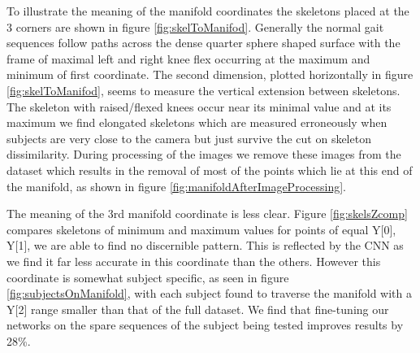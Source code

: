 \documentclass[11pt]{article} %
\begin{document}
To illustrate the meaning of the manifold coordinates the skeletons placed at the 3 corners are shown in figure \ref{fig:skelToManifod}. Generally the normal gait sequences follow paths across the dense quarter sphere shaped surface with the frame of maximal left and right knee flex occurring at the maximum and minimum of first coordinate. The second dimension, plotted horizontally in figure \ref{fig:skelToManifod}, seems to measure the vertical extension between skeletons. The skeleton with raised/flexed knees occur near its minimal value and at its maximum we find elongated skeletons which are measured erroneously when subjects are very close to the camera but just survive the cut on skeleton dissimilarity. During processing of the images we remove these images from the dataset which results in the removal of most of the points which lie at this end of the manifold, as shown in figure \ref{fig:manifoldAfterImageProcessing}. 

The meaning of the 3rd manifold coordinate is less clear. Figure \ref{fig:skelsZcomp} compares skeletons of minimum and maximum values for points of equal Y[0], Y[1], we are able to find no discernible pattern. This is reflected by the CNN as we find it far less accurate in this coordinate than the others. However this coordinate is somewhat subject specific, as seen in figure \ref{fig:subjectsOnManifold}, with each subject found to traverse the manifold with a Y[2] range smaller than that of the full dataset. We find that fine-tuning our networks on the spare sequences of the subject being tested improves results by 28\%. 



\end{document}
